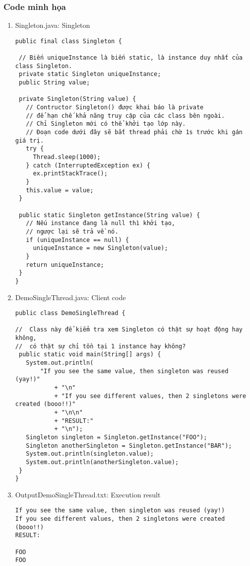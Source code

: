 \documentclass[14pt]{article}
\begin{document}
\subsubsection{ Code minh họa}
\begin{enumerate}

\item Singleton.java: Singleton
\begin{mybox}
\begin{lstlisting}
public final class Singleton {
 
 // Biến uniqueInstance là biến static, là instance duy nhất của class Singleton.
 private static Singleton uniqueInstance;
 public String value;
 
 private Singleton(String value) {
   // Contructor Singleton() được khai báo là private
   // để hạn chế khả năng truy cập của các class bên ngoài.
   // Chỉ Singleton mới có thể khởi tạo lớp này.
   // Đoạn code dưới đây sẽ bắt thread phải chờ 1s trước khi gán giá trị.
   try {
     Thread.sleep(1000);
   } catch (InterruptedException ex) {
     ex.printStackTrace();
   }
   this.value = value;
 }
 
 public static Singleton getInstance(String value) {
   // Nếu instance đang là null thì khởi tạo,
   // ngược lại sẽ trả về nó.
   if (uniqueInstance == null) {
     uniqueInstance = new Singleton(value);
   }
   return uniqueInstance;
 }
}

\end{lstlisting}
\end{mybox}

\item  DemoSingleThread.java: Client code
\begin{mybox}
\begin{lstlisting}
public class DemoSingleThread {
 
//  Class này để kiểm tra xem Singleton có thật sự hoạt động hay không,
//  có thật sự chỉ tồn tại 1 instance hay không?
 public static void main(String[] args) {
   System.out.println(
       "If you see the same value, then singleton was reused (yay!)"
           + "\n"
           + "If you see different values, then 2 singletons were created (booo!!)"
           + "\n\n"
           + "RESULT:"
           + "\n");
   Singleton singleton = Singleton.getInstance("FOO");
   Singleton anotherSingleton = Singleton.getInstance("BAR");
   System.out.println(singleton.value);
   System.out.println(anotherSingleton.value);
 }
}
\end{lstlisting}
\end{mybox}

\item  OutputDemoSingleThread.txt: Execution result
\begin{mybox}
\begin{lstlisting}
If you see the same value, then singleton was reused (yay!)
If you see different values, then 2 singletons were created (booo!!)
RESULT:
 
FOO
FOO
\end{lstlisting}
\end{mybox}


\end{enumerate}
\end{document}

